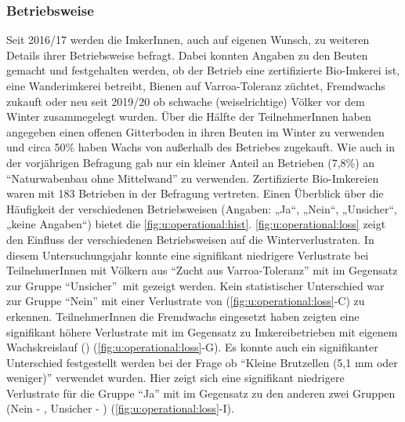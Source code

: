 \subsubsection{Betriebsweise}
\label{ss:betriebsweise:U}

Seit 2016/17 werden die ImkerInnen, auch auf eigenen Wunsch, zu weiteren Details ihrer Betriebsweise befragt. Dabei konnten Angaben zu den Beuten gemacht und festgehalten werden, ob der Betrieb eine zertifizierte Bio-Imkerei ist, eine Wanderimkerei betreibt, Bienen auf Varroa-Toleranz züchtet, Fremdwachs zukauft oder neu seit 2019/20 ob schwache (weiselrichtige) Völker vor dem Winter zusammegelegt wurden.
\newline
Über die Hälfte der TeilnehmerInnen haben angegeben einen offenen Gitterboden in ihren Beuten im Winter zu verwenden und circa 50\% haben Wachs von außerhalb des Betriebes zugekauft. Wie auch in der vorjährigen Befragung gab nur ein kleiner Anteil an Betrieben (7,8\%) an \enquote{Naturwabenbau ohne Mittelwand} zu verwenden. Zertifizierte Bio-Imkereien waren mit 183 Betrieben in der Befragung vertreten. Einen Überblick über die Häufigkeit der verschiedenen Betriebsweisen (Angaben: „Ja``, „Nein``, „Unsicher``, „keine Angaben``) bietet die \cref{fig:u:operational:hist}. 
\newline
\cref{fig:u:operational:loss} zeigt den Einfluss der verschiedenen Betriebsweisen auf die Winterverlustraten. In diesem Untersuchungsjahr konnte eine signifikant niedrigere Verlustrate bei TeilnehmerInnen mit Völkern aus \enquote{Zucht aus Varroa-Toleranz} mit  im Gegensatz zur Gruppe \enquote{Unsicher} mit  gezeigt werden. Kein statistischer Unterschied war zur Gruppe \enquote{Nein} mit einer Verlustrate von  (\cref{fig:u:operational:loss}-C) zu erkennen. TeilnehmerInnen die Fremdwachs eingesetzt haben zeigten eine signifikant höhere Verlustrate mit  im Gegensatz zu Imkereibetrieben mit eigenem Wachskreislauf () (\cref{fig:u:operational:loss}-G). Es konnte auch ein signifikanter Unterschied festgestellt werden bei der Frage ob \enquote{Kleine Brutzellen (5,1 mm oder weniger)} verwendet wurden. Hier zeigt sich eine signifikant niedrigere Verlustrate für die Gruppe \enquote{Ja} mit  im Gegensatz zu den anderen zwei Gruppen (Nein - , Unsicher - ) (\cref{fig:u:operational:loss}-I).
\newline
